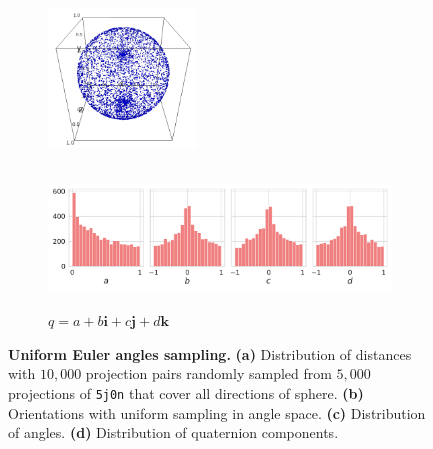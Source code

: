 \begin{figure}[ht!]
    \begin{subfigure}[b]{0.26\linewidth}
        \centering
        \includegraphics[height=10em]{figures/uniform_angles}
        \caption{}%
    \end{subfigure}
    \hfill
    \begin{subfigure}[b]{0.66\linewidth}
        \centering
        \includegraphics[height=10em]{figures/uniform_angles_q}
        \caption{$q = a + b\boldsymbol{i} + c\boldsymbol{j} + d\boldsymbol{k}$}%
    \end{subfigure}
    
     \caption{
        \textbf{Uniform Euler angles sampling.} \textbf{(a)} Distribution of distances with $10,000$ projection pairs randomly sampled from $5,000$ projections of \texttt{5j0n} that cover all directions of sphere. \textbf{(b)} Orientations with uniform sampling in angle space. \textbf{(c)} Distribution of angles. \textbf{(d)} Distribution of quaternion components.
        }\label{fig:uniform-angles}
\end{figure}

